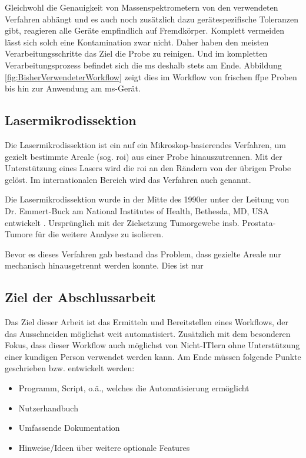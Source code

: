 \documentclass[11pt, a4paper, oneside]{article}
\begin{document}
Gleichwohl die Genauigkeit von Massenspektrometern von den verwendeten Verfahren abhängt und es auch noch zusätzlich dazu gerätespezifische Toleranzen gibt, reagieren alle Geräte empfindlich auf Fremdkörper. Komplett vermeiden lässt sich solch eine Kontamination zwar nicht. Daher haben den meisten Verarbeitungsschritte das Ziel die Probe zu reinigen. Und im kompletten Verarbeitungsprozess befindet sich die \gls{ms} deshalb stets am Ende. Abbildung \ref{fig:BisherVerwendeterWorkflow} zeigt dies im Workflow von frischen \gls{ffpe} Proben bis hin zur Anwendung am \gls{ms}-Gerät.

\subsection{Lasermikrodissektion}\label{ss:Lasermikrodissektion}
Die Lasermikrodissektion ist ein auf ein Mikroskop-basierendes Verfahren, um gezielt bestimmte Areale (sog. \gls{roi}) aus einer Probe hinauszutrennen. Mit der Unterstützung eines Lasers wird die \gls{roi} an den Rändern von der übrigen Probe gelöst. Im internationalen Bereich wird das Verfahren auch  genannt.

Die Lasermikrodissektion wurde in der Mitte des 1990er unter der Leitung von Dr. Emmert-Buck am National Institutes of
Health, Bethesda, MD, USA entwickelt \cite{OverviewLaserMicrodissectionTechnologies}. Ursprünglich mit der Zielsetzung Tumorgewebe \dashAndSpace insb. Prostata-Tumore \dashAndSpace für die weitere Analyse zu isolieren.

Bevor es dieses Verfahren gab bestand das Problem, dass gezielte Areale nur mechanisch hinausgetrennt werden konnte. Dies ist nur


\subsection{Ziel der Abschlussarbeit}\label{ss:ZielDerAbschlussarbeit}
Das Ziel dieser Arbeit ist das Ermitteln und Bereitstellen eines Workflows, der das Ausschneiden möglichst weit automatisiert. Zusätzlich mit dem besonderen Fokus, dass dieser Workflow auch möglichst von Nicht-ITlern ohne Unterstützung einer kundigen Person verwendet werden kann. Am Ende müssen folgende Punkte geschrieben bzw. entwickelt werden:
\begin{itemize}
    \item Programm, Script, o.ä., welches die Automatisierung ermöglicht
    \item Nutzerhandbuch
    \item Umfassende Dokumentation
    \item Hinweise/Ideen über weitere optionale Features
\end{itemize}
\newpage
\end{document}
